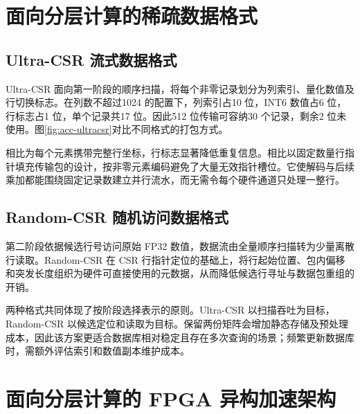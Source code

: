 \section{面向分层计算的稀疏数据格式}
\subsection{Ultra-CSR 流式数据格式}
Ultra-CSR 面向第一阶段的顺序扫描，将每个非零记录划分为列索引、量化数值及行切换标志。在列数不超过1024 的配置下，列索引占10 位，INT6 数值占6 位，行标志占1 位，单个记录共17 位。因此512 位传输可容纳30 个记录，剩余2 位未使用。图\ref{fig:acc-ultracsr}对比不同格式的打包方式。


相比为每个元素携带完整行坐标，行标志显著降低重复信息。相比以固定数量行指针填充传输包的设计，按非零元素编码避免了大量无效指针槽位。它使解码与后续乘加都能围绕固定记录数建立并行流水，而无需令每个硬件通道只处理一整行。

\subsection{Random-CSR 随机访问数据格式}
第二阶段依据候选行号访问原始 FP32 数值，数据流由全量顺序扫描转为少量离散行读取。Random-CSR 在 CSR 行指针定位的基础上，将行起始位置、包内偏移和突发长度组织为硬件可直接使用的元数据，从而降低候选行寻址与数据包重组的开销。


两种格式共同体现了按阶段选择表示的原则。Ultra-CSR 以扫描吞吐为目标，Random-CSR 以候选定位和读取为目标。保留两份矩阵会增加静态存储及预处理成本，因此该方案更适合数据库相对稳定且存在多次查询的场景；频繁更新数据库时，需额外评估索引和数值副本维护成本。

\section{面向分层计算的 FPGA 异构加速架构}
